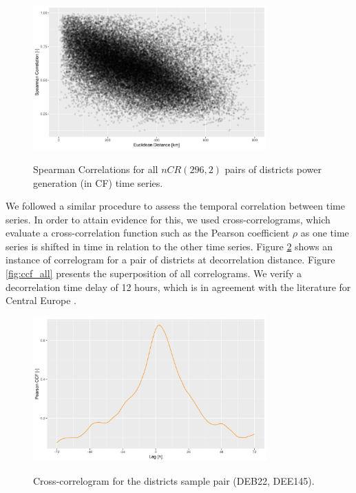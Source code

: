\begin{figure}[H]%
	\centering
    \caption{Spearman Correlations for all $nCR(296, 2)$ pairs of districts power generation (in CF) time series.}
    \includegraphics[width=0.8\textwidth]{correlation-spearman-vs-distance}
	\label{fig:correlogram}
\end{figure}

We followed a similar procedure to assess the temporal correlation between time series.
In order to attain evidence for this, we used cross-correlograms, which evaluate a cross-correlation function such as the Pearson coefficient $\rho$ as one time series is shifted in time in relation to the other time series.
Figure \ref{fig:ccf} shows an instance of correlogram for a pair of districts at decorrelation distance.
Figure \ref{fig:ccf_all} presents the superposition of all correlograms.
We verify a decorrelation time delay of 12 hours, which is in agreement with the literature for Central Europe \cite{engeland2017variability}.

\begin{figure}[H]%
	\centering
    \caption{Cross-correlogram for the districts sample pair (DEB22, DEE145).}
    \includegraphics[width=0.8\textwidth]{ccf-sample_20200630_072805}
	\label{fig:ccf}
\end{figure}

